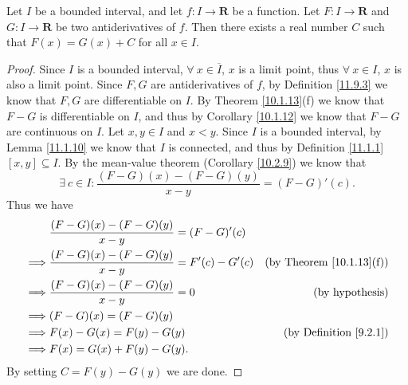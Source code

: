 \begin{lemma}\label{11.9.5}
    Let \(I\) be a bounded interval, and let \(f : I \to \mathbf{R}\) be a function.
    Let \(F : I \to \mathbf{R}\) and \(G : I \to \mathbf{R}\) be two antiderivatives of \(f\).
    Then there exists a real number \(C\) such that \(F(x) = G(x) + C\) for all \(x \in I\).
\end{lemma}

\begin{proof}
    Since \(I\) is a bounded interval, \(\forall\ x \in \overline{I}\), \(x\) is a limit point, thus \(\forall\ x \in I\), \(x\) is also a limit point.
    Since \(F, G\) are antiderivatives of \(f\), by Definition \ref{11.9.3} we know that \(F, G\) are differentiable on \(I\).
    By Theorem \ref{10.1.13}(f) we know that \(F - G\) is differentiable on \(I\), and thus by Corollary \ref{10.1.12} we know that \(F - G\) are continuous on \(I\).
    Let \(x, y \in I\) and \(x < y\).
    Since \(I\) is a bounded interval, by Lemma \ref{11.1.10} we know that \(I\) is connected, and thus by Definition \ref{11.1.1} \([x, y] \subseteq I\).
    By the mean-value theorem (Corollary \ref{10.2.9}) we know that
    \[
        \exists\ c \in I : \frac{(F - G)(x) - (F - G)(y)}{x - y} = (F - G)'(c).
    \]
    Thus we have
    \begin{align*}
                 & \frac{(F - G)(x) - (F - G)(y)}{x - y} = (F - G)'(c)                                          \\
        \implies & \frac{(F - G)(x) - (F - G)(y)}{x - y} = F'(c) - G'(c) & \text{(by Theorem \ref{10.1.13}(f))} \\
        \implies & \frac{(F - G)(x) - (F - G)(y)}{x - y} = 0             & \text{(by hypothesis)}               \\
        \implies & (F - G)(x) = (F - G)(y)                                                                      \\
        \implies & F(x) - G(x) = F(y) - G(y)                             & \text{(by Definition \ref{9.2.1})}   \\
        \implies & F(x) = G(x) + F(y) - G(y).
    \end{align*}
    By setting \(C = F(y) - G(y)\) we are done.
\end{proof}